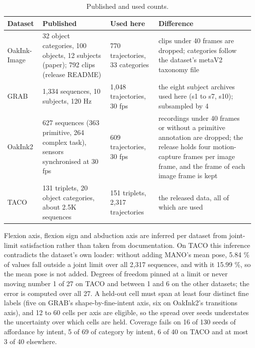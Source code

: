 \documentclass[10pt]{article}
\begin{document}
\begin{table}[!h]
\caption{Published and used counts.}
\label{tab:A1}
\begin{center}
\footnotesize
\setlength{\tabcolsep}{3pt}
\begin{tabular}{p{}p{}p{}p{}}
\toprule
\textbf{Dataset} & \textbf{Published} & \textbf{Used here} & \textbf{Difference} \\
\midrule
OakInk-Image & 32 object categories, 100 objects, 12 subjects (paper); 792 clips (release README) & 770 trajectories, 33 categories & clips under 40 frames are dropped; categories follow the dataset's metaV2 taxonomy file \\
GRAB & 1,334 sequences, 10 subjects, 120 Hz & 1,048 trajectories, 30 fps & the eight subject archives used here (s1 to s7, s10); subsampled by 4 \\
OakInk2 & 627 sequences (363 primitive, 264 complex task), sensors synchronised at 30 fps & 609 trajectories, 30 fps & recordings under 40 frames or without a primitive annotation are dropped; the release holds four motion-capture frames per image frame, and the frame of each image frame is kept \\
TACO & 131 triplets, 20 object categories, about 2.5K sequences & 151 triplets, 2,317 trajectories & the released data, all of which are used \\
\bottomrule
\end{tabular}
\end{center}
\end{table}

Flexion axis, flexion sign and abduction axis are inferred per dataset from joint-limit satisfaction rather than taken from documentation. On TACO this inference contradicts the dataset's own loader: without adding MANO's mean pose, 5.84 \% of values fall outside a joint limit over all 2,317 sequences, and with it 15.99 \%, so the mean pose is not added. Degrees of freedom pinned at a limit or never moving number 1 of 27 on TACO and between 1 and 6 on the other datasets; the error is computed over all 27. A held-out cell must span at least four distinct fine labels (five on GRAB's shape-by-fine-intent axis, six on OakInk2's transitions axis), and 12 to 60 cells per axis are eligible, so the spread over seeds understates the uncertainty over which cells are held. Coverage fails on 16 of 130 seeds of affordance by intent, 5 of 69 of category by intent, 6 of 40 on TACO and at most 3 of 40 elsewhere.
\end{document}
